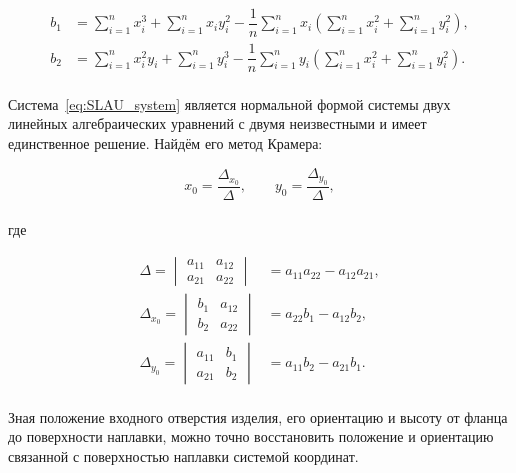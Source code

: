 \begin{align*}
    b_1 &= \sum_{i=1}^{n} x_i^3 + \sum_{i=1}^{n} x_i y_i^2
    - \dfrac{1}{n} \sum_{i=1}^{n} x_i \left(
    \sum_{i=1}^{n} x_i^2 + \sum_{i=1}^{n} y_i^2 \right), \\
    b_2 &= \sum_{i=1}^{n} x_i^2 y_i + \sum_{i=1}^{n} y_i^3
    - \dfrac{1}{n} \sum_{i=1}^{n} y_i \left(
    \sum_{i=1}^{n} x_i^2 + \sum_{i=1}^{n} y_i^2 \right).
\end{align*} \\

Система~\ref{eq:SLAU_system} является нормальной формой системы двух линейных алгебраических уравнений с двумя неизвестными и имеет единственное решение.
Найдём его метод Крамера:

\begin{equation*}
    x_0 = \dfrac{\Delta_{x_0}}{\Delta}, \qquad
    y_0 = \dfrac{\Delta_{y_0}}{\Delta},
\end{equation*} \\
где

\begin{align*}
    \Delta = \begin{vmatrix}
                 a_{11} & a_{12} \\
                 a_{21} & a_{22}
    \end{vmatrix} &= a_{11} a_{22} - a_{12} a_{21}, \\
    \Delta_{x_0} = \begin{vmatrix}
                       b_1 & a_{12} \\
                       b_2 & a_{22}
    \end{vmatrix} &= a_{22} b_1 - a_{12} b_2, \\
    \Delta_{y_0} = \begin{vmatrix}
                       a_{11} & b_1 \\
                       a_{21} & b_2
    \end{vmatrix} &= a_{11} b_2 - a_{21} b_1.
\end{align*} \\

Зная положение входного отверстия изделия, его ориентацию и высоту от фланца до поверхности наплавки, можно точно восстановить положение и ориентацию связанной с поверхностью наплавки системой координат.



